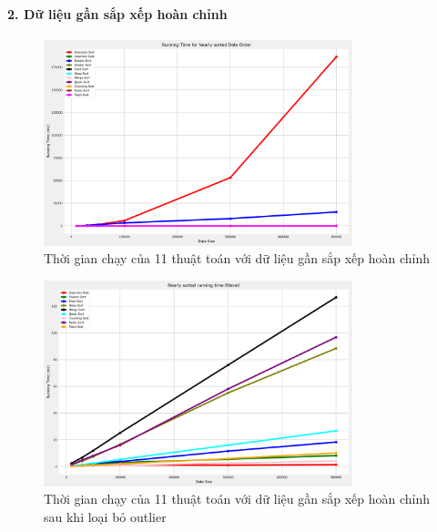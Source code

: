 \paragraph{2. Dữ liệu gần sắp xếp hoàn chỉnh}
\begin{figure}[H]
    \centering
    \includegraphics[width=0.8\textwidth]{img/results/nearly_sorted_running_time.png}
    \caption{Thời gian chạy của 11 thuật toán với dữ liệu gần sắp xếp hoàn chỉnh}
\end{figure}

\begin{figure}[H]
    \centering
    \includegraphics[width=0.8\textwidth]{img/results/nearly_sorted_running_time_filtered.png}
    \caption{Thời gian chạy của 11 thuật toán với dữ liệu gần sắp xếp hoàn chỉnh sau khi loại bỏ outlier}
\end{figure}


